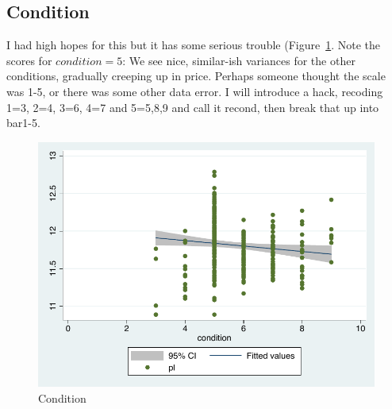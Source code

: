 \documentclass[twocolumn,11pt]{article}
\begin{document}
\subsection*{Condition}
I had high hopes for this but it has some serious trouble (Figure~\ref{fig:condition-scatter}.
Note the scores for $condition=5$:
We see nice, similar-ish variances for the other conditions, gradually creeping up in price.
Perhaps someone thought the scale was 1-5, or there was some other data error. 
I will introduce a hack, recoding 1=3, 2=4, 3=6, 4=7 and 5=5,8,9 and call it recond,
then break that up into bar1-5. 
\begin{figure}[H]
\centering
  \includegraphics[width=.9\linewidth]{figures/condition-scatter.pdf}
  \caption{Condition}
  \label{fig:condition-scatter}
\end{figure}

\end{document}
